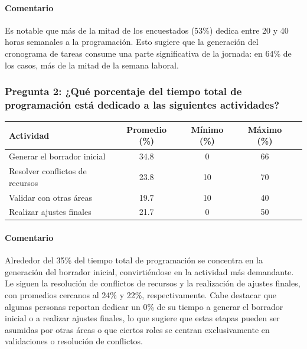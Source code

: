 \documentclass{article}
\begin{document}
\begin{appendix}
    \paragraph{Comentario} Es notable que más de la mitad de los encuestados (53\%) dedica entre 20 y 40 horas semanales a la programación. Esto sugiere que la generación del cronograma de tareas consume una parte significativa de la jornada: en 64\% de los casos, más de la mitad de la semana laboral.
    
    
    \vspace{1.5em}
    \subsubsection*{Pregunta 2: ¿Qué porcentaje del tiempo total de programación está dedicado a las siguientes actividades?}
    \vspace{.5em}
    
    \begin{table}[H]
        \centering
        \begin{tabular}{lccc c}
            \toprule
            \textbf{Actividad} & \textbf{Promedio (\%)} & \textbf{Mínimo (\%)} & \textbf{Máximo (\%)} \\
            \midrule
            Generar el borrador inicial & 34.8 & 0 & 66\\
            Resolver conflictos de recursos & 23.8 & 10 & 70\\
            Validar con otras áreas & 19.7 & 10 & 40\\
            Realizar ajustes finales & 21.7 & 0 & 50\\
            \bottomrule
        \end{tabular}
        \label{tab:distribucion_actividades}
    \end{table}
    
    \paragraph{Comentario} Alrededor del 35\% del tiempo total de programación se concentra en la generación del borrador inicial, convirtiéndose en la actividad más demandante. Le siguen la resolución de conflictos de recursos y la realización de ajustes finales, con promedios cercanos al 24\% y 22\%, respectivamente. Cabe destacar que algunas personas reportan dedicar un 0\% de su tiempo a generar el borrador inicial o a realizar ajustes finales, lo que sugiere que estas etapas pueden ser asumidas por otras áreas o que ciertos roles se centran exclusivamente en validaciones o resolución de conflictos.
    

\end{appendix}
\end{document}
